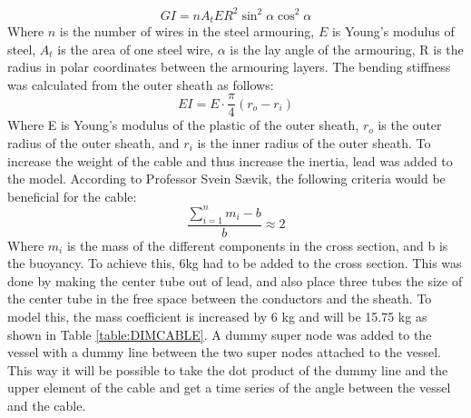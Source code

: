 \begin{equation}
    GI=nA_t E R^2 \sin^2 \alpha \cos^2 \alpha
\end{equation}
Where $n$ is the number of wires in the steel armouring, $E$ is Young's modulus of steel, $A_t$ is the area of one steel wire, $\alpha$ is the lay angle of the armouring, R is the radius in polar coordinates between the armouring layers.  \newline
\newline 
The bending stiffness was calculated from the outer sheath as follows:
\begin{equation}
    EI= E\cdot \frac{\pi}{4}(r_o-r_i)
\end{equation}
Where E is Young's modulus of the plastic of the outer sheath, $r_o$ is the outer radius of the outer sheath, and $r_i$ is the inner radius of the outer sheath. \newline
\newline 
To increase the weight of the cable and thus increase the inertia, lead was added to the model. According to Professor Svein Sævik, the following criteria would be beneficial for the cable:
\begin{equation}
    \frac{\sum_{i=1}^n m_i - b}{b}\approx 2
\end{equation}
Where $m_i$ is the mass of the different components in the cross section, and b is the buoyancy. To achieve this, 6kg had to be added to the cross section. This was done by making the center tube out of lead, and also place three tubes the size of the center tube in the free space between the conductors and the sheath. To model this, the mass coefficient is increased by 6 kg and will be 15.75 kg as shown in Table \ref{table:DIMCABLE}. \newline
\newline A dummy super node was added to the vessel with a dummy line between the two super nodes attached to the vessel. This way it will be possible to take the dot product of the dummy line and the upper element of the cable and get a time series of the angle between the vessel and the cable.
